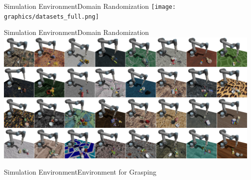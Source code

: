 \begin{frame}{Simulation Environment}{Domain Randomization}
    \centering
    \texttt{[image: graphics/datasets\_full.png]}
\end{frame}

\begin{frame}{Simulation Environment}{Domain Randomization}
    \centering
    \includegraphics[height=6.5cm]{graphics/domain_randomisation.png}
\end{frame}

\begin{frame}{Simulation Environment}{Environment for Grasping}
    \centering
\end{frame}
